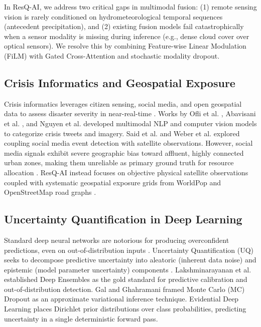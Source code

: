 \documentclass[journal]{IEEEtran}
\begin{document}
In ResQ-AI, we address two critical gaps in multimodal fusion: (1) remote sensing vision is rarely conditioned on hydrometeorological temporal sequences (antecedent precipitation), and (2) existing fusion models fail catastrophically when a sensor modality is missing during inference (e.g., dense cloud cover over optical sensors). We resolve this by combining Feature-wise Linear Modulation (FiLM) \cite{perez2018film} with Gated Cross-Attention and stochastic modality dropout.

\subsection{Crisis Informatics and Geospatial Exposure}
Crisis informatics leverages citizen sensing, social media, and open geospatial data to assess disaster severity in near-real-time \cite{imran2020, alam2021}. Works by Ofli et al. \cite{ofli2020}, Abavisani et al. \cite{abavisani2020}, and Nguyen et al. \cite{nguyen2020} developed multimodal NLP and computer vision models to categorize crisis tweets and imagery. Said et al. \cite{said2019} and Weber et al. \cite{weber2020} explored coupling social media event detection with satellite observations. However, social media signals exhibit severe geographic bias toward affluent, highly connected urban zones, making them unreliable as primary ground truth for resource allocation \cite{alam2020}. ResQ-AI instead focuses on objective physical satellite observations coupled with systematic geospatial exposure grids from WorldPop \cite{lloyd2019} and OpenStreetMap road graphs \cite{haklay2008}.

\subsection{Uncertainty Quantification in Deep Learning}
Standard deep neural networks are notorious for producing overconfident predictions, even on out-of-distribution inputs \cite{ovadia2019, gawlikowski2023}. Uncertainty Quantification (UQ) seeks to decompose predictive uncertainty into aleatoric (inherent data noise) and epistemic (model parameter uncertainty) components \cite{abdar2021, wilson2020}. Lakshminarayanan et al. \cite{lakshminarayanan2017} established Deep Ensembles as the gold standard for predictive calibration and out-of-distribution detection. Gal and Ghahramani \cite{gal2016} framed Monte Carlo (MC) Dropout as an approximate variational inference technique. Evidential Deep Learning \cite{sensoy2018, amini2020} places Dirichlet prior distributions over class probabilities, predicting uncertainty in a single deterministic forward pass.
\end{document}
